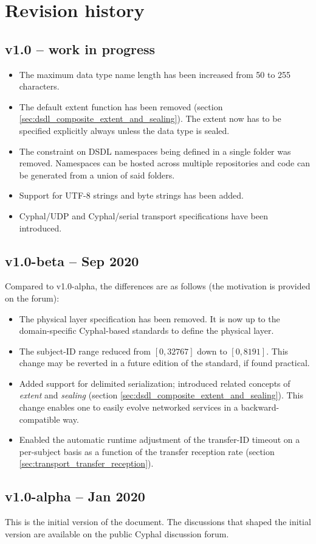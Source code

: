 \section{Revision history}

\subsection{v1.0 -- work in progress}

\begin{itemize}
    \item The maximum data type name length has been increased from 50 to 255 characters.

    \item The default extent function has been removed (section \ref{sec:dsdl_composite_extent_and_sealing}).
    The extent now has to be specified explicitly always unless the data type is sealed.

    \item The constraint on DSDL namespaces being defined in a single folder was removed. Namespaces can be hosted
    across multiple repositories and code can be generated from a union of said folders.

    \item Support for UTF-8 strings and byte strings has been added.

    \item Cyphal/UDP and Cyphal/serial transport specifications have been introduced.
\end{itemize}

\subsection{v1.0-beta -- Sep 2020}

Compared to v1.0-alpha, the differences are as follows (the motivation is provided on the forum):

\begin{itemize}
    \item The physical layer specification has been removed.
    It is now up to the domain-specific Cyphal-based standards to define the physical layer.

    \item The subject-ID range reduced from $[0, 32767]$ down to $[0, 8191]$.
    This change may be reverted in a future edition of the standard, if found practical.

    \item Added support for delimited serialization; introduced related concepts of \emph{extent} and \emph{sealing}
    (section \ref{sec:dsdl_composite_extent_and_sealing}).
    This change enables one to easily evolve networked services in a backward-compatible way.

    \item Enabled the automatic runtime adjustment of the transfer-ID timeout on a per-subject basis
    as a function of the transfer reception rate (section \ref{sec:transport_transfer_reception}).
\end{itemize}

\subsection{v1.0-alpha -- Jan 2020}

This is the initial version of the document.
The discussions that shaped the initial version are available on the public Cyphal discussion forum.

